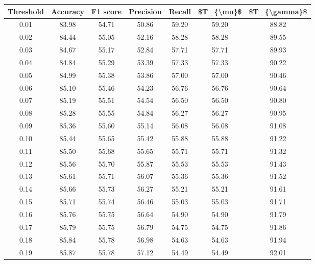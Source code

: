 \begin{tabular}{|c|c|c|c|c|c|c|}
\hline
 Threshold &  Accuracy &  F1 score &  Precision &  Recall &  \$T\_\{\textbackslash mu\}\$ &  \$T\_\{\textbackslash gamma\}\$ \\
\hline
      0.01 &     83.98 &     54.71 &      50.86 &   59.20 &      59.20 &         88.82 \\
      0.02 &     84.44 &     55.05 &      52.16 &   58.28 &      58.28 &         89.55 \\
      0.03 &     84.67 &     55.17 &      52.84 &   57.71 &      57.71 &         89.93 \\
      0.04 &     84.84 &     55.29 &      53.39 &   57.33 &      57.33 &         90.22 \\
      0.05 &     84.99 &     55.38 &      53.86 &   57.00 &      57.00 &         90.46 \\
      0.06 &     85.10 &     55.46 &      54.23 &   56.76 &      56.76 &         90.64 \\
      0.07 &     85.19 &     55.51 &      54.54 &   56.50 &      56.50 &         90.80 \\
      0.08 &     85.28 &     55.55 &      54.84 &   56.27 &      56.27 &         90.95 \\
      0.09 &     85.36 &     55.60 &      55.14 &   56.08 &      56.08 &         91.08 \\
      0.10 &     85.44 &     55.65 &      55.42 &   55.88 &      55.88 &         91.22 \\
      0.11 &     85.50 &     55.68 &      55.65 &   55.71 &      55.71 &         91.32 \\
      0.12 &     85.56 &     55.70 &      55.87 &   55.53 &      55.53 &         91.43 \\
      0.13 &     85.61 &     55.71 &      56.07 &   55.36 &      55.36 &         91.52 \\
      0.14 &     85.66 &     55.73 &      56.27 &   55.21 &      55.21 &         91.61 \\
      0.15 &     85.71 &     55.74 &      56.46 &   55.03 &      55.03 &         91.71 \\
      0.16 &     85.76 &     55.75 &      56.64 &   54.90 &      54.90 &         91.79 \\
      0.17 &     85.79 &     55.75 &      56.79 &   54.75 &      54.75 &         91.86 \\
      0.18 &     85.84 &     55.78 &      56.98 &   54.63 &      54.63 &         91.94 \\
      0.19 &     85.87 &     55.78 &      57.12 &   54.49 &      54.49 &         92.01 \\

\end{tabular}
